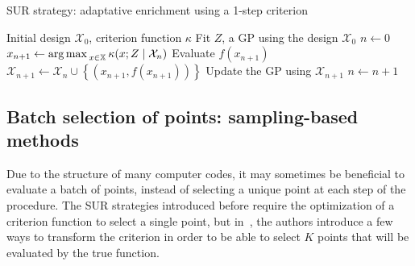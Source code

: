 \documentclass[../../Main_ManuscritThese.tex]{subfiles}
\begin{document}
\begin{algorithm}
  \caption{\label{alg:SUR_strat} SUR strategy: adaptative enrichment using a 1-step criterion}
\begin{algorithmic}
\REQUIRE Initial design $\mathcal{X}_0$, criterion function $\kappa$
\STATE Fit $Z$, a GP using the design $\mathcal{X}_0$
\STATE $n \leftarrow 0$
\STATE $x_{n+1} \leftarrow \operatorname*{arg\,max \,}_{x \in \mathbb{X}} \kappa(x; Z \mid \mathcal{X}_{n})$
\STATE Evaluate $f(x_{n+1})$
\STATE $\mathcal{X}_{n+1} \leftarrow \mathcal{X}_n \cup \left\{\left(x_{n+1}, f(x_{n+1})\right)\right\}$
\STATE Update the GP using $\mathcal{X}_{n+1}$
\STATE $n \leftarrow n + 1$
\ENDWHILE
\end{algorithmic}
\end{algorithm}


\subsection{Batch selection of points: sampling-based methods}
\label{sec:sampling_based_criterion}

Due to the structure of many computer codes, it may sometimes be
beneficial to evaluate a batch of points, instead of selecting a
unique point at each step of the procedure. The SUR strategies
introduced before require the optimization of a criterion function to
select a single point, but in~\cite{ginsbourger_kriging_2010}, the
authors introduce a few ways to transform the criterion in order to be
able to select $K$ points that will be evaluated by the true function.
\end{document}
